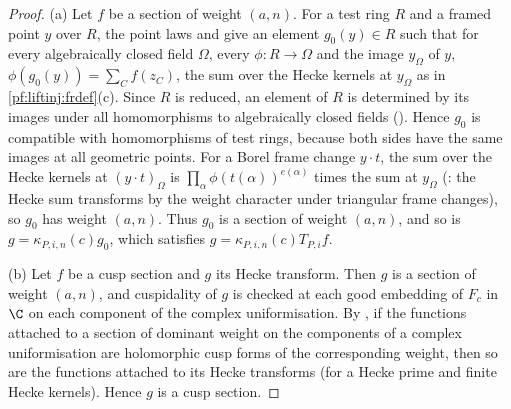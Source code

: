 \begin{proof}
(a) Let $f$ be a section of weight $(a,n)$. For a test ring $R$ and a framed point $y$ over $R$, the point laws and
 give an element $g_0(y)\in R$ such that for every algebraically closed field $\Omega$, every
$\phi:R\to\Omega$ and the image $y_\Omega$ of $y$, $\phi(g_0(y))=\sum_Cf(z_C)$, the sum over the Hecke kernels at $y_\Omega$ as in
\cref{pf:liftinj:frdef}(c). Since $R$ is reduced, an element of
$R$ is determined by its images under all homomorphisms to algebraically closed fields
(). Hence $g_0$ is compatible with homomorphisms of test rings, because
both sides have the same images at all geometric points. For a Borel frame change $y\cdot t$, the sum over the Hecke kernels at $(y\cdot t)_\Omega$ is
$\prod_\alpha\phi(t(\alpha))^{e(\alpha)}$ times the sum at $y_\Omega$ (: the Hecke sum
transforms by the weight character under triangular frame changes), so $g_0$ has weight $(a,n)$. Thus $g_0$ is a section of weight $(a,n)$, and so is
$g=\kappa_{P,i,n}(c)g_0$, which satisfies $g=\kappa_{P,i,n}(c)T_{P,i}f$.

(b) Let $f$ be a cusp section and $g$ its Hecke transform. Then $g$ is a section of weight $(a,n)$, and cuspidality of $g$ is checked at each good
embedding of $F_c$ in $\C$ on each component of the complex uniformisation. By , if the functions attached to
a section of dominant weight on the components of a complex uniformisation are holomorphic cusp forms of the corresponding weight, then so are the
functions attached to its Hecke transforms (for a Hecke prime and finite Hecke kernels). Hence $g$ is a cusp section.
\end{proof}

